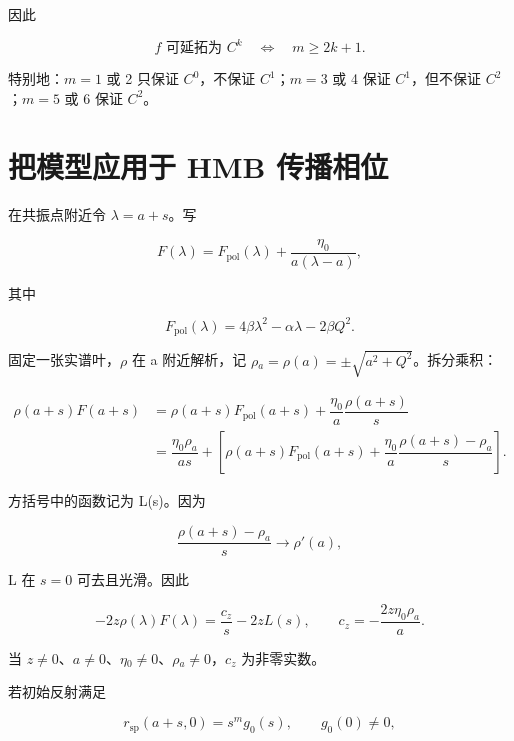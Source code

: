 因此\par

\[
\boxed{
f\text{ 可延拓为 }C^k
\quad\Longleftrightarrow\quad m\ge2k+1.
}
\]

特别地：$m=1$ 或 2 只保证 $C^{0}$，不保证 $C^{1}$；$m=3$ 或 4 保证 $C^{1}$，但不保证 $C^{2}$；$m=5$ 或 6 保证 $C^{2}$。\par

\section{把模型应用于 HMB 传播相位}
\par

在共振点附近令 $\lambda{}=a+s$。写\par

\[
F(\lambda)=F_{\mathrm{pol}}(\lambda)
+\dfrac{\eta_0}{a(\lambda-a)},
\]

其中\par

\[
F_{\mathrm{pol}}(\lambda)=4\beta\lambda^2-\alpha\lambda-2\beta Q^2.
\]

固定一张实谱叶，$\rho{}$ 在 a 附近解析，记 $\rho{}_a=\rho{}(a)=\pm{}\sqrt{a^{2}+Q^{2}}$。拆分乘积：\par

\[
\begin{aligned}
\rho(a+s)F(a+s)
&=\rho(a+s)F_{\mathrm{pol}}(a+s)
+\dfrac{\eta_0}{a}\dfrac{\rho(a+s)}{s}\\
&=\dfrac{\eta_0\rho_a}{as}
+\left[
\rho(a+s)F_{\mathrm{pol}}(a+s)
+\dfrac{\eta_0}{a}\dfrac{\rho(a+s)-\rho_a}{s}
\right].
\end{aligned}
\]

方括号中的函数记为 L(s)。因为\par

\[
\dfrac{\rho(a+s)-\rho_a}{s}\longrightarrow\rho'(a),
\]

L 在 $s=0$ 可去且光滑。因此\par

\[
-2z\rho(\lambda)F(\lambda)
=\dfrac{c_z}{s}-2zL(s),
\qquad
c_z=-\dfrac{2z\eta_0\rho_a}{a}.
\]

当 $z\ne{}0$、$a\ne{}0$、$\eta{}_{0}\ne{}0$、$\rho{}_a\ne{}0$，$c_z$ 为非零实数。\par

若初始反射满足\par

\[
r_{\mathrm{sp}}(a+s,0)=s^m g_0(s),
\qquad g_0(0)\ne0,
\]

